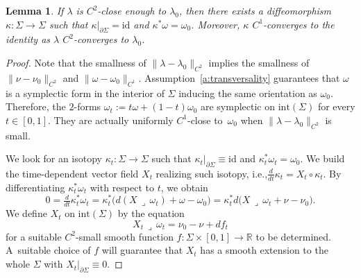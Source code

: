 \documentclass[11pt]{article}
\newcommand{\ie}{i.e.,\xspace}
\numberwithin{equation}{section}
\let\mathds\mathbb
\newtheorem{lem}[thm]{Lemma}
\theoremstyle{definition}
\newcommand{\id}{\mathrm{id}}
\newcommand{\R}{\mathds{R}}
\let\diff d
\begin{document}
\begin{lem}
\label{l:pullback_to_nu0}
If $\lambda$ is $C^2$-close enough to $\lambda_0$, then there exists a diffeomorphism $\kappa:\Sigma\to\Sigma$ such that $\kappa|_{\partial\Sigma}=\id$ and $\kappa^*\omega=\omega_0$. Moreover, $\kappa$ $C^1$-converges to the identity as $\lambda$ $C^2$-converges to $\lambda_0$.
\end{lem}

\begin{proof}
Note that the smallness of $\|\lambda-\lambda_0\|_{C^2}$ implies the smallness of $\|\nu-\nu_0\|_{C^2}$ and $\|\omega-\omega_0\|_{C^1}$. Assumption~\ref{a:transversality} guarantees that $\omega$ is a symplectic form in the interior of $\Sigma$ inducing the same orientation as $\omega_0$. Therefore, the $2$-forms $\omega_t:=t\omega+(1-t)\omega_0$ are symplectic on $\mathrm{int}(\Sigma)$ for every $t\in[0,1]$. They are actually uniformly $C^1$-close to~$\omega_0$ when $\|\lambda-\lambda_0\|_{C^2}$ is small.

We look for an isotopy $\kappa_t:\Sigma\to\Sigma$ such that $\kappa_t|_{\partial\Sigma}\equiv\mathrm{id}$ and $\kappa_t^*\omega_t=\omega_0$. We build the time-dependent vector field $X_t$ realizing such isotopy, \ie $\tfrac{\diff}{\diff t}\kappa_t=X_t\circ\kappa_t$. By differentiating $\kappa_t^*\omega_t$ with respect to $t$, we obtain
\begin{equation}
\label{e:X_Moser_0}
0=\tfrac{\diff}{\diff t}\kappa_t^*\omega_t
=
\kappa_t^* \big( \diff(X\,\lrcorner\,\omega_t) + \omega-\omega_0 \big)
=
\kappa_t^* \diff\big(X\,\lrcorner\,\omega_t + \nu-\nu_0 \big) .
\end{equation}
We define $X_t$ on $\mathrm{int}(\Sigma)$ by the equation
\begin{equation}
\label{e:X_Moser}
X_t\,\lrcorner\,\omega_t = \nu_0 - \nu + \diff f_t
\end{equation}
for a suitable $C^2$-small smooth function $f:\Sigma\times [0,1] \to\R$ to be determined. A~suitable choice of $f$ will guarantee that $X_t$ has a smooth extension to the whole $\Sigma$ with $X_t|_{\partial\Sigma}\equiv0$.


\end{proof}
\end{document}
